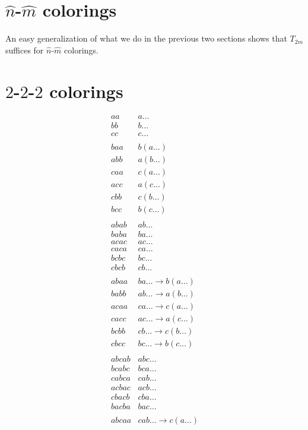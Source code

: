 \documentclass[a4paper]{article}
\begin{document}
\section{$\hat{n}$-$\hat{m}$ colorings}

An easy generalization of what we do in the previous two sections shows
that $T_{2m}$ suffices for $\hat{n}$-$\hat{m}$ colorings.

\section{$2$-$2$-$2$ colorings}

\[
\begin{array}{ll}
aa & a\dots \\
bb & b\dots \\
cc & c\dots \\
\\
baa & b(a\dots) \\
abb & a(b\dots) \\
caa & c(a\dots) \\
acc & a(c\dots) \\
cbb & c(b\dots) \\
bcc & b(c\dots) \\
\\
abab & ab\dots \\
baba & ba\dots \\
acac & ac\dots \\
caca & ca\dots \\
bcbc & bc\dots \\
cbcb & cb\dots \\
\\
abaa & ba\dots \to b(a\dots) \\
babb & ab\dots \to a(b\dots) \\
acaa & ca\dots \to c(a\dots) \\
cacc & ac\dots \to a(c\dots) \\
bcbb & cb\dots \to c(b\dots) \\
cbcc & bc\dots \to b(c\dots) \\
\\
abcab & abc\dots \\
bcabc & bca\dots \\
cabca & cab\dots \\
acbac & acb\dots \\
cbacb & cba\dots \\
bacba & bac\dots \\
\\
abcaa & cab\dots \to c(a\dots) \\

\end{array}\]
\end{document}
